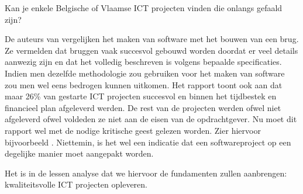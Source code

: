 \begin{exercise}
	Kan je enkele Belgische of Vlaamse ICT projecten vinden die onlangs gefaald zijn?
\end{exercise}

De auteurs van \cite{International1995} vergelijken het maken van software  met het bouwen van een brug. Ze vermelden dat bruggen vaak succesvol gebouwd worden doordat er veel details aanwezig zijn en dat het volledig beschreven is volgens bepaalde specificaties. Indien men dezelfde methodologie zou gebruiken voor het maken van software zou men wel eens bedrogen kunnen uitkomen. Het rapport toont ook aan dat maar 26\% van gestarte ICT projecten succesvol en binnen het tijdbestek en financieel plan afgeleverd werden. De rest van de projecten werden ofwel niet afgeleverd ofwel voldeden ze niet aan de eisen van de opdrachtgever. Nu moet dit rapport wel met de nodige kritische geest gelezen worden. Zier hiervoor bijvoorbeeld \cite{Glass2006}. Niettemin, is het wel een indicatie dat een softwareproject op een degelijke manier moet aangepakt worden. 

Het is in de lessen analyse dat we hiervoor de fundamenten zullen aanbrengen: kwaliteitsvolle ICT projecten opleveren.



